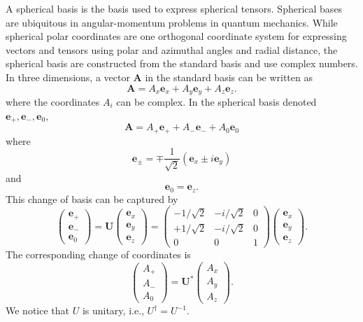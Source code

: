 \documentclass[11pt]{article}
\newcommand{\f}[2]{\frac{#1}{#2}}
\begin{document}
\begin{appendices}
A spherical basis is the basis used to express spherical tensors. Spherical bases are ubiquitous in angular-momentum problems in quantum mechanics. While spherical polar coordinates are one orthogonal coordinate system for expressing vectors and tensors using polar and azimuthal angles and radial distance, the spherical basis are constructed from the standard basis and use complex numbers. In three dimensions, a vector $\mathbf{A}$ in the standard basis can be written as
\begin{equation*}
\mathbf{A} = {A}_x \mathbf{e}_x + {A}_y \mathbf{e}_y + {A}_z \mathbf{e}_z.
\end{equation*}
where the coordinates $A_i$ can be complex. In the spherical basis denoted $\mathbf{e}_+, \mathbf{e}_-, \mathbf{e}_0$, 
\begin{equation*}
\mathbf{A} = {A}_+ \mathbf{e}_+ + 
{A}_- \mathbf{e}_- + {A}_0 \mathbf{e}_0
\end{equation*}
where
\begin{equation*}
\mathbf{e}_\pm = \mp \f{1}{\sqrt{2}} (\mathbf{e}_x \pm i\mathbf{e}_y)
\end{equation*}
and
\begin{equation*}
\mathbf{e}_0 = \mathbf{e}_z.
\end{equation*}
This change of basis can be captured by 
\begin{equation*}
\begin{pmatrix}
\mathbf{e}_+ \\ \mathbf{e}_- \\ \mathbf{e}_0
\end{pmatrix}
=
\mathbf{U}
\begin{pmatrix}
\mathbf{e}_x \\ \mathbf{e}_y \\ \mathbf{e}_z
\end{pmatrix}
= 
\begin{pmatrix}
-1/\sqrt{2} & -i/\sqrt{2} & 0\\
+1/\sqrt{2} & -i/\sqrt{2} & 0\\
0 & 0 & 1
\end{pmatrix}
\begin{pmatrix}
\mathbf{e}_x \\ \mathbf{e}_y \\ \mathbf{e}_z
\end{pmatrix}.
\end{equation*}
The corresponding change of coordinates is 
\begin{equation*}
\begin{pmatrix}
{A}_+ \\ {A}_- \\ {A}_0
\end{pmatrix}
=
\mathbf{U}^*
\begin{pmatrix}
{A}_x \\ {A}_y \\ {A}_z
\end{pmatrix}.
\end{equation*}
We notice that $U$ is unitary, i.e., $U^\dagger = U^{-1}$.  



\end{appendices}
\end{document}
